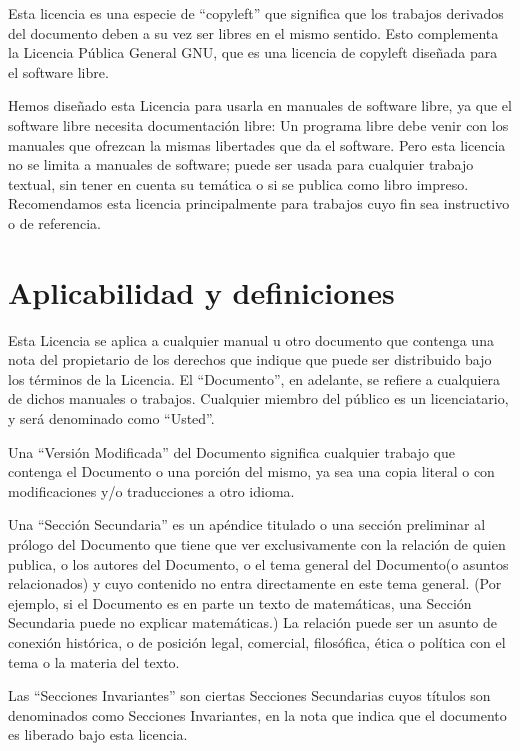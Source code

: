 Esta licencia  es una  especie de ``copyleft''  que significa  que los
trabajos derivados del documento deben a su vez ser libres en el mismo
sentido. Esto complementa la Licencia  Pública General GNU, que es una
licencia de copyleft diseñada para el software libre.

Hemos  diseñado esta  Licencia  para usarla  en  manuales de  software
libre,  ya que  el  software libre  necesita  documentación libre:  Un
programa  libre debe  venir con  los manuales  que ofrezcan  la mismas
libertades  que da  el software.  Pero esta  licencia no  se limita  a
manuales de software; puede ser  usada para cualquier trabajo textual,
sin tener  en cuenta su temática  o si se publica  como libro impreso.
Recomendamos esta  licencia principalmente para trabajos  cuyo fin sea
instructivo o de referencia.

\section{Aplicabilidad y definiciones}

Esta  Licencia se  aplica  a  cualquier manual  u  otro documento  que
contenga una  nota del pro\-pie\-ta\-rio  de los derechos  que indique
que  puede  ser distribuido  bajo  los  términos  de la  Licencia.  El
``Documento'', en adelante, se refiere a cualquiera de dichos manuales
o trabajos. Cualquier miembro del  público es un licenciatario, y será
denominado como ``Usted''.

Una ``Versión  Modificada'' del Documento significa  cualquier trabajo
que contenga  el Documento o una  porción del mismo, ya  sea una copia
literal o con modificaciones y/o traducciones a otro idioma.

Una  ``Sección Secundaria''  es  un apéndice  titulado  o una  sección
preliminar al prólogo  del Documento que tiene  que ver exclusivamente
con la  relación de quien publica,  o los autores del  Documento, o el
tema general del Documento(o asuntos relacionados) y cuyo contenido no
entra directamente en este tema general. (Por ejemplo, si el Documento
es en parte  un texto de matemáticas, una Sección  Secundaria puede no
explicar matemáticas.)  La relación  puede ser  un asunto  de conexión
histórica,  o  de  posición  legal,  comercial,  filosófica,  ética  o
política con el tema o la materia del texto.

Las ``Secciones Invariantes'' son  ciertas Secciones Secundarias cuyos
títulos son  denominados como  Secciones Invariantes,  en la  nota que
indica que el documento es liberado bajo esta licencia.

